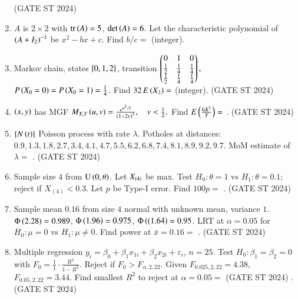 \documentclass[journal,12pt,onecolumn]{IEEEtran}
\theoremstyle{remark}
\begin{document}
\begin{enumerate}
\begin{enumerate}
\end{enumerate}
\hfill (GATE ST 2024)
\item
$A$ is $2\times2$ with $\mathrm{tr}\left(A\right)=5$, $\det\left(A\right)=6$. Let the characteristic polynomial of $\left(A+I_2\right)^{-1}$ be $x^2 - b x + c$.  
Find $b/c =$ \underline{\phantom{imagine}} (integer).

\item
Markov chain, states $\left\{0,1,2\right\}$, transition
$
\begin{pmatrix}
0 & 1 & 0 \\
\frac12 & \frac14 & \frac14\\
\frac12 & \frac14 & \frac14
\end{pmatrix},
$
$P\left(X_0=0\right) = P\left(X_0=1\right) = \frac14$. Find $32\,E\left(X_2\right) =$ \underline{\phantom{imagine}} (integer).
\hfill (GATE ST 2024)
\item
$\left(x,y\right)$ has MGF
$
M_{X,Y}\left(u,v\right) = \frac{e^{u^2/2}}{\left(1-2v\right)^3},\quad v<\frac12.
$
Find $E\left( \frac{6X^2}{Y} \right) =$ \underline{\phantom{imagine}} .
\hfill (GATE ST 2024)
\item
$\left\{N\left(t\right)\right\}$ Poisson process with rate $\lambda$. Potholes at distances:  
$0.9, 1.3, 1.8, 2.7, 3.4, 4.1, 4.7, 5.5, 6.2, 6.8, 7.4, 8.1, 8.9, 9.2, 9.7$.  
MoM estimate of $\lambda =$ \underline{\phantom{imagine}} .
\hfill (GATE ST 2024)
\item
Sample size $4$ from $\mathrm{U}\left(0,\theta\right)$. Let $X_{\left(4\right)}$ be max. Test $H_0: \theta=1$ vs $H_1: \theta=0.1$; reject if $X_{(4)}<0.3$. Let $p$ be Type-I error. Find $100p =$ \underline{\phantom{imagine}} .
\hfill (GATE ST 2024)
\item
Sample mean $0.16$ from size $4$ normal with unknown mean, variance $1$. $\Phi\left(2.28\right)=0.989$, $\Phi\left(1.96\right)=0.975$, $\Phi\left((1.64\right)=0.95$.  
LRT at $\alpha=0.05$ for $H_0:\mu=0$ vs $H_1:\mu\neq0$. Find power at $\bar{x}=0.16 =$ \underline{\phantom{imagine}} .
\hfill (GATE ST 2024)
\item
Multiple regression $y_i = \beta_0 + \beta_1 x_{1i} + \beta_2 x_{2i} + \varepsilon_i$, $n=25$. Test $H_0: \beta_1=\beta_2=0$ with  
$
F_0 = \frac{1}{1} \cdot \frac{R^2}{1-R^2}.
$
Reject if $F_0 > F_{\alpha,2,22}$. Given $F_{0.025,2,22}=4.38$, $F_{0.05,2,22}=3.44$.  
Find smallest $R^2$ to reject at $\alpha=0.05 =$ \hfill (GATE ST 2024)\underline{\phantom{imagine}} .
\hfill (GATE ST 2024)
\end{enumerate}
\end{document}
